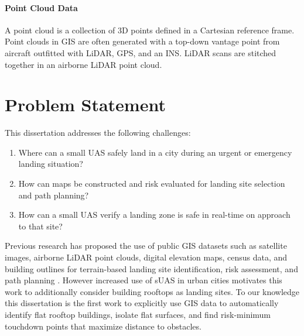 
\paragraph{Point Cloud Data}
A point cloud is a collection of 3D points defined in a Cartesian reference frame. %
Point clouds in \ac{GIS} are often generated with a top-down vantage point from aircraft outfitted with \ac{LiDAR}, \ac{GPS}, and an \ac{INS}.  \ac{LiDAR} scans are stitched together in an airborne \ac{LiDAR} point cloud. 


\section{Problem Statement}

This dissertation addresses the following challenges:

\begin{enumerate}[noitemsep]
    \itemsep0em 
    \item Where can a small UAS safely land in a city during an urgent or emergency landing situation?
    \item How can maps be constructed and risk evaluated for landing site selection and path planning?
    \item How can a small UAS verify a landing zone is safe in real-time on approach to that site?
\end{enumerate}

Previous research has proposed the use of public \ac{GIS} datasets such as satellite images, airborne LiDAR point clouds, digital elevation maps, census data, and building outlines for terrain-based landing site identification, risk assessment, and path planning \cite{meuleau_emergency_2009, di_donato_evaluating_2017, patterson_timely_2014, bleier_risk_2015}.  However increased use of \acf{sUAS} in urban cities motivates this work to additionally consider building rooftops as landing sites. To our knowledge this dissertation is the first work to explicitly use GIS data to automatically identify flat rooftop buildings, isolate flat surfaces, and find risk-minimum touchdown points that maximize distance to obstacles. 


